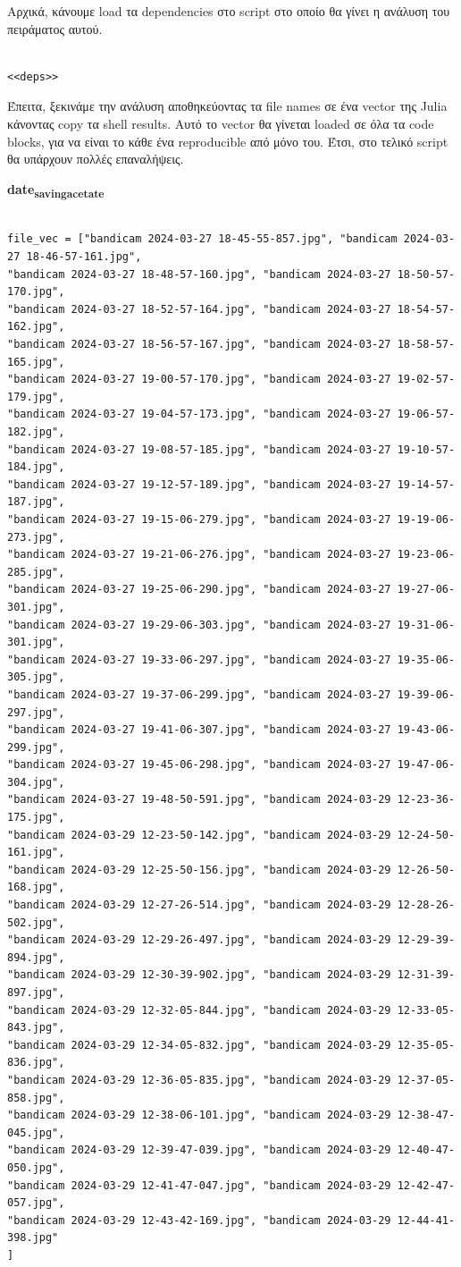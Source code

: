\documentclass[11pt]{article}
\begin{document}
Αρχικά, κάνουμε load τα dependencies στο script στο οποίο θα γίνει η ανάλυση του πειράματος αυτού.

\begin{verbatim}

<<deps>>

\end{verbatim}

Έπειτα, ξεκινάμε την ανάλυση αποθηκεύοντας τα file names σε ένα vector της Julia κάνοντας copy τα shell results. Αυτό το vector θα γίνεται loaded σε όλα τα code blocks, για να είναι το κάθε ένα reproducible από μόνο του. Έτσι, στο τελικό script θα υπάρχουν πολλές επαναλήψεις.

\textbf{date\textsubscript{saving}\textsubscript{acetate}}
\begin{verbatim}

file_vec = ["bandicam 2024-03-27 18-45-55-857.jpg", "bandicam 2024-03-27 18-46-57-161.jpg",
"bandicam 2024-03-27 18-48-57-160.jpg", "bandicam 2024-03-27 18-50-57-170.jpg",
"bandicam 2024-03-27 18-52-57-164.jpg", "bandicam 2024-03-27 18-54-57-162.jpg",
"bandicam 2024-03-27 18-56-57-167.jpg", "bandicam 2024-03-27 18-58-57-165.jpg",
"bandicam 2024-03-27 19-00-57-170.jpg", "bandicam 2024-03-27 19-02-57-179.jpg",
"bandicam 2024-03-27 19-04-57-173.jpg", "bandicam 2024-03-27 19-06-57-182.jpg",
"bandicam 2024-03-27 19-08-57-185.jpg", "bandicam 2024-03-27 19-10-57-184.jpg",
"bandicam 2024-03-27 19-12-57-189.jpg", "bandicam 2024-03-27 19-14-57-187.jpg",
"bandicam 2024-03-27 19-15-06-279.jpg", "bandicam 2024-03-27 19-19-06-273.jpg",
"bandicam 2024-03-27 19-21-06-276.jpg", "bandicam 2024-03-27 19-23-06-285.jpg",
"bandicam 2024-03-27 19-25-06-290.jpg", "bandicam 2024-03-27 19-27-06-301.jpg",
"bandicam 2024-03-27 19-29-06-303.jpg", "bandicam 2024-03-27 19-31-06-301.jpg",
"bandicam 2024-03-27 19-33-06-297.jpg", "bandicam 2024-03-27 19-35-06-305.jpg",
"bandicam 2024-03-27 19-37-06-299.jpg", "bandicam 2024-03-27 19-39-06-297.jpg",
"bandicam 2024-03-27 19-41-06-307.jpg", "bandicam 2024-03-27 19-43-06-299.jpg",
"bandicam 2024-03-27 19-45-06-298.jpg", "bandicam 2024-03-27 19-47-06-304.jpg",
"bandicam 2024-03-27 19-48-50-591.jpg", "bandicam 2024-03-29 12-23-36-175.jpg",
"bandicam 2024-03-29 12-23-50-142.jpg", "bandicam 2024-03-29 12-24-50-161.jpg",
"bandicam 2024-03-29 12-25-50-156.jpg", "bandicam 2024-03-29 12-26-50-168.jpg",
"bandicam 2024-03-29 12-27-26-514.jpg", "bandicam 2024-03-29 12-28-26-502.jpg",
"bandicam 2024-03-29 12-29-26-497.jpg", "bandicam 2024-03-29 12-29-39-894.jpg",
"bandicam 2024-03-29 12-30-39-902.jpg", "bandicam 2024-03-29 12-31-39-897.jpg",
"bandicam 2024-03-29 12-32-05-844.jpg", "bandicam 2024-03-29 12-33-05-843.jpg",
"bandicam 2024-03-29 12-34-05-832.jpg", "bandicam 2024-03-29 12-35-05-836.jpg",
"bandicam 2024-03-29 12-36-05-835.jpg", "bandicam 2024-03-29 12-37-05-858.jpg",
"bandicam 2024-03-29 12-38-06-101.jpg", "bandicam 2024-03-29 12-38-47-045.jpg",
"bandicam 2024-03-29 12-39-47-039.jpg", "bandicam 2024-03-29 12-40-47-050.jpg",
"bandicam 2024-03-29 12-41-47-047.jpg", "bandicam 2024-03-29 12-42-47-057.jpg",
"bandicam 2024-03-29 12-43-42-169.jpg", "bandicam 2024-03-29 12-44-41-398.jpg"
]


\end{verbatim}
\end{document}
